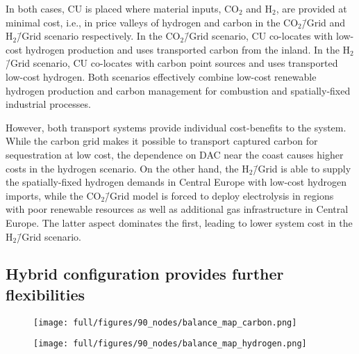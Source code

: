 \documentclass[twocolumn]{article}
\newcommand{\modCO}{CO$_2$\=/Grid model}
\newcommand{\carbon}{CO$_2$}
\newcommand{\hydrogen}{H$_2$}
\newcommand{\carbongrid}{CO$_2$\=/Grid}
\newcommand{\hydrogengrid}{H$_2$\=/Grid}
\newcommand{\hybridmodel}{Hybrid model}
\newcommand{\carbonscenario}{CO$_2$\=/Grid scenario}
\newcommand{\hydrogenscenario}{H$_2$\=/Grid scenario}
\begin{document}
In both cases, CU is placed where material inputs, \carbon{} and \hydrogen{}, are provided at minimal cost, i.e., in price valleys of hydrogen and carbon in the \carbongrid{} and \hydrogenscenario{} respectively. In the \carbonscenario{}, CU co-locates with low-cost hydrogen production and uses transported carbon from the inland. In the \hydrogenscenario{}, CU co-locates with carbon point sources and uses transported low-cost hydrogen.
Both scenarios effectively combine low-cost renewable hydrogen production and carbon management for combustion and spatially-fixed industrial processes.

However, both transport systems provide individual cost-benefits to the system. While the carbon grid makes it possible to transport captured carbon for sequestration at low cost, the dependence on DAC near the coast causes higher costs in the hydrogen scenario{}. On the other hand, the \hydrogengrid{} is able to supply the spatially-fixed hydrogen demands in Central Europe with low-cost hydrogen imports, while the \modCO{} is forced to deploy electrolysis in regions with poor renewable resources as well as additional gas infrastructure in Central Europe. The latter aspect dominates the first, leading to lower system cost in the \hydrogenscenario{}.



\subsection*{Hybrid configuration provides further flexibilities}\label{subsec:Hybrid}


\begin{figure*}[ht!]
    \centering
    \begin{subfigure}{.5\textwidth}
        \centering
        \texttt{[image: full/figures/90\_nodes/balance\_map\_carbon.png]}
        \label{fig:balance_map_carbon_full}
    \end{subfigure}%
    \begin{subfigure}{.5\textwidth}
        \centering
        \texttt{[image: full/figures/90\_nodes/balance\_map\_hydrogen.png]}
        \label{fig:balance_map_hydrogen_full}
    \end{subfigure}
    \caption{Optimal operation, flows and prices of the carbon (left) and hydrogen (right) sectors for the \hybridmodel{} in the net zero scenario. For each region, upper semicircles show the average production per technology, lower semicircles the consumption, and colors the average marginal prices. Carbon Sequestration offshore are drawn as full circles. Lines and arrows show the interregional transportation. \carbon{} from point-source in the inland either supplies local CU with imported \hydrogen{} or facilitates sequestration in nearby offshore regions.
    }
    \label{fig:balance_map_full}
\end{figure*}
\end{document}
